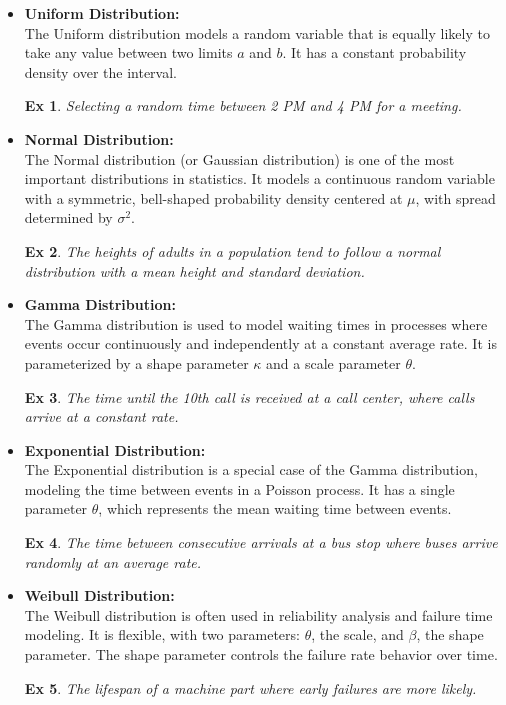 \documentclass[a4paper,extrafontsizes, 9pt]{memoir}
\newtheorem*{ex}{Ex}
\begin{document}
\begin{multicols}{2}
\begin{itemize}
    \item \textbf{Uniform Distribution:} \\
    The Uniform distribution models a random variable that is equally likely to take any value between two limits $a$ and $b$. It has a constant probability density over the interval.
    \begin{ex}
        Selecting a random time between 2 PM and 4 PM for a meeting.
    \end{ex}

    \item \textbf{Normal Distribution:} \\
    The Normal distribution (or Gaussian distribution) is one of the most important distributions in statistics. It models a continuous random variable with a symmetric, bell-shaped probability density centered at $\mu$, with spread determined by $\sigma^2$.
    \begin{ex}
        The heights of adults in a population tend to follow a normal distribution with a mean height and standard deviation.
    \end{ex}

    \item \textbf{Gamma Distribution:} \\
    The Gamma distribution is used to model waiting times in processes where events occur continuously and independently at a constant average rate. It is parameterized by a shape parameter $\kappa$ and a scale parameter $\theta$.
    \begin{ex}
        The time until the 10th call is received at a call center, where calls arrive at a constant rate.
    \end{ex}

    \item \textbf{Exponential Distribution:} \\
    The Exponential distribution is a special case of the Gamma distribution, modeling the time between events in a Poisson process. It has a single parameter $\theta$, which represents the mean waiting time between events.
    \begin{ex}
        The time between consecutive arrivals at a bus stop where buses arrive randomly at an average rate.
    \end{ex}

    \item \textbf{Weibull Distribution:} \\
    The Weibull distribution is often used in reliability analysis and failure time modeling. It is flexible, with two parameters: $\theta$, the scale, and $\beta$, the shape parameter. The shape parameter controls the failure rate behavior over time.
    \begin{ex}
        The lifespan of a machine part where early failures are more likely.
    \end{ex}


\end{itemize}
\end{multicols}
\end{document}
